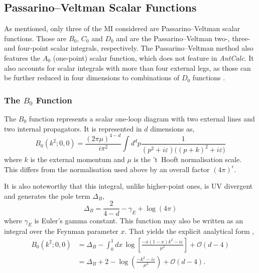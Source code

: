 \subsection{Passarino--Veltman Scalar Functions}

As mentioned, only three of the MI considered are Passarino--Veltman scalar functions. Those are 
$B_0$, $C_0$ and $D_0$ and are the Passarino--Veltman two-, three- and four-point 
scalar integrals, respectively. The Passarino--Veltman method also features the $A_0$ (one-point)
scalar function, which does not feature in \textit{AntCalc}. It also accounts for 
scalar integrals with more than four external legs, as those can be further reduced 
in four dimensions to combinations of $D_0$ functions \cite{Melrose:1965kb,vanNeerven:1983vr}.

\subsubsection{The $B_0$ Function}\label{subsubsec:B0}

The $B_0$ function represents a scalar one-loop diagram with two external lines and 
two internal propagators. It is represented in $d$ dimensions as,
\begin{equation}
    B_0\!\left(k^2;0,0\right) = \frac{(2\pi\mu)^{4-d}}{i\pi^2}\int d^dp\frac1{\left(p^2+i\varepsilon\right)\Big((p+k)^2+i\varepsilon\Big)}
\end{equation}
where $k$ is the external momentum and $\mu$ is the 't~Hooft normalisation scale. This differs from the normalisation used above by an overall factor $(4\pi)^\epsilon$.

It is also noteworthy that this integral, unlike higher-point ones, is UV divergent and 
generates the pole term $\Delta_B$, 
\begin{equation}
    \Delta_B = \frac2{4-d}-\gamma_E+\log(4\pi)
\end{equation}
where $\gamma_E$ is Euler's gamma constant.
This function may also be written as an integral over the Feynman parameter $x$. That 
yields the explicit analytical form \cite{Passarino:1979pv},
\begin{equation}
    \begin{split}
        B_0\!\left(k^2;0,0\right) &= \Delta_B - \int_0^1 dx\,\log\!\left[\frac{-x(1-x)k^2-i\varepsilon}{\mu^2}\right] + \mathcal O(d-4)\\
        &= \Delta_B + 2 - \log\!\left(\frac{-k^2-i\varepsilon}{\mu^2}\right) + \mathcal O(d-4).
    \end{split}
\end{equation}

